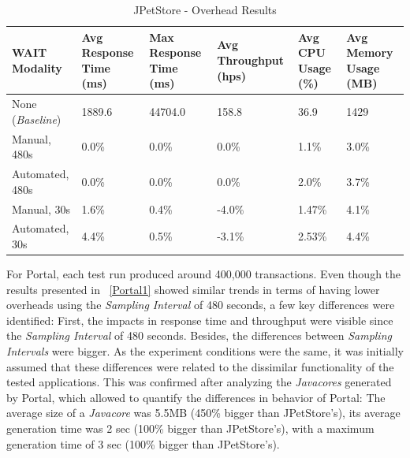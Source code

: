 \documentclass[runningheads,a4paper]{llncs}
\begin{document}
\vspace{-2pt}
\begin{table}[!h]
\caption{JPetStore - Overhead Results}
\label{PetStore1}
\centering
\begin{tabular}{p{}|p{}|p{}|p{}|p{}|p{}}
\hline
\bfseries WAIT Modality & \bfseries Avg Response Time (ms)& \bfseries Max
Response Time (ms)& \bfseries Avg Throughput (hps)& \bfseries Avg CPU Usage
(\%) & \bfseries Avg Memory Usage (MB)\\
\hline
None (\emph{Baseline}) 	& 1889.6	& 44704.0	& 158.8 	& 36.9 		& 1429\\
Manual, 480s 			& 0.0\% 	& 0.0\%		& 0.0\%		& 1.1\% 	& 3.0\%\\
Automated, 480s 		& 0.0\%		& 0.0\%		& 0.0\% 	& 2.0\% 	& 3.7\%\\
Manual, 30s 			& 1.6\%		& 0.4\%		& -4.0\% 	& 1.47\% 	& 4.1\%\\
Automated, 30s 			& 4.4\%		& 0.5\%		& -3.1\% 	& 2.53\% 	& 4.4\%\\
\hline
\end{tabular}
\end{table}
\vspace{-2pt}

For Portal, each test run produced around 400,000 transactions. Even though the
results presented in \tablename ~\ref{Portal1} showed similar trends in terms of
having lower overheads using the \emph{Sampling Interval} of 480 seconds, a few
key differences were identified: First, the impacts in response time and
throughput were visible since the \emph{Sampling Interval} of 480 seconds.
Besides, the differences between \emph{Sampling Intervals} were bigger. As the
experiment conditions were the same, it was initially assumed that these differences 
were related to the dissimilar functionality of the tested applications. This was confirmed 
after analyzing the \emph{Javacores} generated by Portal, which allowed to
quantify the differences in behavior of Portal: The average size of a \emph{Javacore} was
5.5MB (450\% bigger than JPetStore's), its average generation time was 2 sec
(100\% bigger than JPetStore's), with a maximum generation time of 3 sec (100\%
bigger than JPetStore's).
\end{document}
